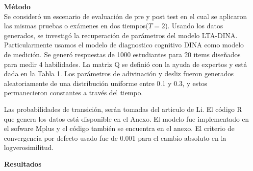 \noindent
\textbf{M\'{e}todo}\\
Se consider\'{o} un escenario de evaluaci\'{o}n de pre y post test en el cual se aplicaron las mismas pruebas o ex\'{a}menes en dos tiempos($T=2$). Usando los datos generados, se investig\'{o} la recuperaci\'{o}n de par\'{a}metros del modelo LTA-DINA. Particularmente usamos el modelo de diagnostico cognitivo DINA como modelo de medici\'{o}n. Se gener\'{o} respuestas de 1000 estudiantes para 20 items dise\~{n}ados para medir 4 habilidades. La matriz Q se defini\'{o} con la ayuda de expertos y est\'{a} dada en la Tabla 1. Los par\'{a}metros de adivinaci\'{o}n y desliz fueron generados aleatoriamente de una distribuci\'{o}n uniforme entre 0.1 y 0.3, y estos permanecieron constantes a trav\'{e}s del tiempo.

\noindent
Las probabilidades de transici\'{o}n, ser\'{a}n tomadas del articulo de Li.     
El c\'{o}digo R que genera los datos est\'{a} disponible en el Anexo. El modelo fue implementado en el sofware Mplus y el c\'{o}digo tambi\'{e}n se encuentra en el anexo. El criterio de convergencia por defecto usado fue de 0.001 para el cambio absoluto en la logverosimilitud.

\noindent
\textbf{Resultados}\\
 
